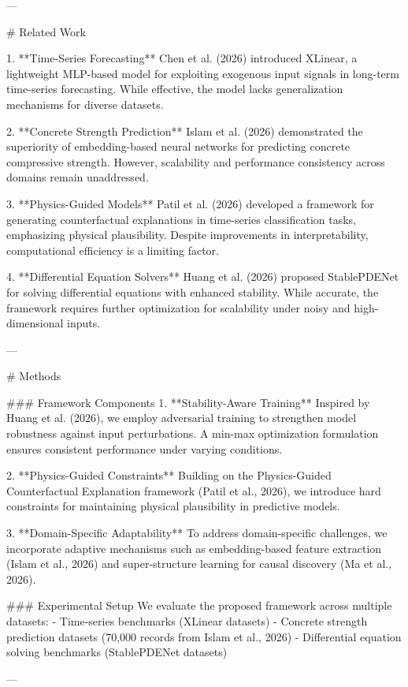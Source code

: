 ---

# Related Work

1. **Time-Series Forecasting**  
Chen et al. (2026) introduced XLinear, a lightweight MLP-based model for exploiting exogenous input signals in long-term time-series forecasting. While effective, the model lacks generalization mechanisms for diverse datasets.  

2. **Concrete Strength Prediction**  
Islam et al. (2026) demonstrated the superiority of embedding-based neural networks for predicting concrete compressive strength. However, scalability and performance consistency across domains remain unaddressed.  

3. **Physics-Guided Models**  
Patil et al. (2026) developed a framework for generating counterfactual explanations in time-series classification tasks, emphasizing physical plausibility. Despite improvements in interpretability, computational efficiency is a limiting factor.  

4. **Differential Equation Solvers**  
Huang et al. (2026) proposed StablePDENet for solving differential equations with enhanced stability. While accurate, the framework requires further optimization for scalability under noisy and high-dimensional inputs.  

---

# Methods

### Framework Components
1. **Stability-Aware Training**  
Inspired by Huang et al. (2026), we employ adversarial training to strengthen model robustness against input perturbations. A min-max optimization formulation ensures consistent performance under varying conditions.

2. **Physics-Guided Constraints**  
Building on the Physics-Guided Counterfactual Explanation framework (Patil et al., 2026), we introduce hard constraints for maintaining physical plausibility in predictive models.  

3. **Domain-Specific Adaptability**  
To address domain-specific challenges, we incorporate adaptive mechanisms such as embedding-based feature extraction (Islam et al., 2026) and super-structure learning for causal discovery (Ma et al., 2026).

### Experimental Setup
We evaluate the proposed framework across multiple datasets:
- Time-series benchmarks (XLinear datasets)
- Concrete strength prediction datasets (70,000 records from Islam et al., 2026)
- Differential equation solving benchmarks (StablePDENet datasets)

---

